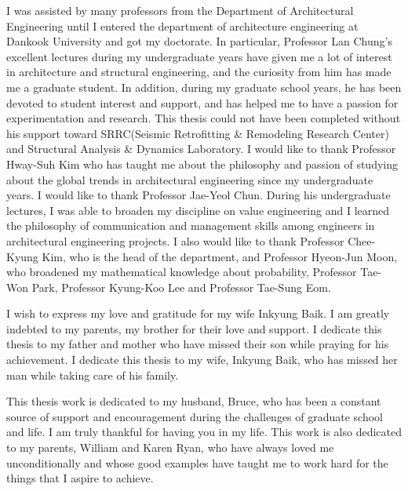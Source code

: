 I was assisted by many professors from the Department of Architectural Engineering until I entered the department of architecture engineering at Dankook University and got my doctorate. In particular, Professor Lan Chung's excellent lectures during my undergraduate years have given me a lot of interest in architecture and structural engineering, and the curiosity from him has made me a graduate student. In addition, during my graduate school years, he has been devoted to student interest and support, and has helped me to have a passion for experimentation and research. This thesis could not have been completed without his support toward SRRC(Seismic Retrofitting \& Remodeling Research Center) and Structural Analysis \& Dynamics Laboratory. I would like to thank Professor Hway-Suh Kim who has taught me about the philosophy and passion of studying about the global trends in architectural engineering since my undergraduate years. I would like to thank Professor Jae-Yeol Chun. During his undergraduate lectures, I was able to broaden my discipline on value engineering and I learned the philosophy of communication and management skills among engineers in architectural engineering projects. I also would like to thank Professor Chee-Kyung Kim, who is the head of the department, and Professor Hyeon-Jun Moon, who broadened my mathematical knowledge about probability, Professor Tae-Won Park, Professor Kyung-Koo Lee and Professor Tae-Sung Eom.

I wish to express my love and gratitude for my wife Inkyung Baik. I am greatly indebted to my parents, my brother for their love and support.
I dedicate this thesis to my father and mother who have missed their son while praying for his achievement.
I dedicate this thesis to my wife, Inkyung Baik, who has missed her man while taking care of his family.

This thesis work is dedicated to my husband, Bruce, who has been a constant source of support and encouragement during the challenges of graduate school and life. I am truly thankful for having you in my life. This work is also dedicated to my parents, William and Karen Ryan, who have always loved me unconditionally and whose good examples have taught me to work hard for the things that I aspire to achieve. 
